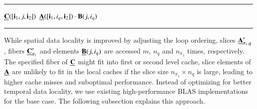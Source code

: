 \begin{algorithm}[t]
\DontPrintSemicolon
{}
%
\footnotesize 
\SetAlgoVlined
\hrule
\BlankLine
{}
{
	{
	}
	{
		{
			\;
		}		
	}	
	\Else%
	{
		{
			{			
				{
					$\underline{\mathbf{C}}([\mathbf{i}_1,j,\mathbf{i}_2])$ \ttt{+=} $\underline{\mathbf{A}}([\mathbf{i}_1,i_q,\mathbf{i}_2]) \cdot \mathbf{B}(j,i_q)$\;
				}
			}
		}
	}
}
\BlankLine
\hrule
\caption{
\footnotesize %
Modified baseline algorithm with contiguous memory access for the tensor-matrix multiplication.
The tensor order $p$ must be greater than $1$ and the contraction mode $q$ must satisfy $1 \leq q \leq p$ and $\pi_1 \neq q$.
The initial call must happen with $r=p$ where $\mbn$ is the shape tuple of $\mubA$ and $m$ is the $q$-th dimension of $\mubC$. 
\label{alg:ttm.sequential.coalesced}
}
\end{algorithm}

While spatial data locality is improved by adjusting the loop ordering, slices $\underline{\mathbf{A}}_{\pi_1,q}'$, fibers $\underline{\mathbf{C}}_{\pi_1}'$ and elements $\underline{\mathbf{B}}(j,i_q)$ are accessed $m$, $n_q$ and $n_{\pi_1}$ times, respectively.
The specified fiber of $\mubC$ might fit into first or second level cache, slice elements of $\mubA$ are unlikely to fit in the local caches if the slice size $n_{\pi_1} \times n_q$ is large, leading to higher cache misses and suboptimal performance.
Instead of optimizing for better temporal data locality, we use existing high-performance BLAS implementations for the base case.
The following subsection explains this approach.

